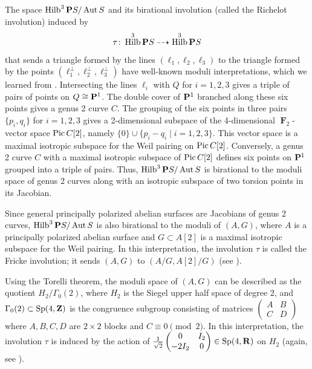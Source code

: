 \documentclass[11pt,reqno]{amsart}
\theoremstyle{plain}
\theoremstyle{definition}
\theoremstyle{remark}
\numberwithin{equation}{section}
\DeclareMathOperator{\Hilb}{Hilb}
\DeclareMathOperator{\F}{\mathbf F}
\numberwithin{equation}{section}
\begin{document}
\begin{remark}\label{rem:richelot}
  The space $\Hilb^3 \P S / \Aut S$ and its birational involution (called the Richelot involution) induced by
  \begin{equation}\label{eqn:richelot}
    \tau \from \Hilb^3 \P S \dashrightarrow \Hilb^3 \P S
  \end{equation}
  that sends a triangle formed by the lines $(\ell_1, \ell_2, \ell_3)$ to the triangle formed by the points $(\ell_1^\perp, \ell_2^\perp, \ell_3^\perp)$ have well-known moduli interpretations, which we learned from \cite[Example~4.2]{dol.how:15}.
  Intersecting the lines $\ell_i$ with $Q$ for $i = 1, 2, 3$ gives a triple of pairs of points on $Q \cong \P^1$.
  The double cover of $\P^1$ branched along these six points gives a genus 2 curve $C$.
  The grouping of the six points in three pairs $\{p_i, q_i\}$ for $i = 1, 2, 3$ gives a 2-dimensional subspace of the 4-dimensional $\F_2$-vector space $\Pic C [2]$, namely $\{0\} \cup \{p_i - q_i \mid i = 1,2,3\}$.
  This vector space is a maximal isotropic subspace for the Weil pairing on $\Pic C[2]$.
  Conversely, a genus 2 curve $C$ with a maximal isotropic subspace of $\Pic C[2]$ defines six points on $\P^1$ grouped into a triple of pairs.
  Thus, $\Hilb^3 \P S / \Aut S$ is birational to the moduli space of genus 2 curves along with an isotropic subspace of two torsion points in its Jacobian.

  Since general principally polarized abelian surfaces are Jacobians of genus 2 curves, $\Hilb^3 \P S / \Aut S$ is also birational to the moduli of $(A, G)$, where $A$ is a principally polarized abelian surface and $G \subset A[2]$ is a maximal isotropic subspace for the Weil pairing.
  In this interpretation, the involution $\tau$ is called the Fricke involution; it sends $(A, G)$ to $(A/G, A[2]/G)$ (see \cite[Page~2]{muk:12}).

  Using the Torelli theorem, the moduli space of $(A, G)$ can be described as the quotient $H_2/\Gamma_0(2)$, where $H_2$ is the Siegel upper half space of degree 2, and $\Gamma_0(2) \subset \operatorname{Sp}(4, \Z)$ is the congruence subgroup consisting of matrices $\begin{pmatrix} A & B \\ C & D \end{pmatrix}$ where $A, B, C, D$ are $2 \times 2$ blocks and $C \equiv 0 \pmod 2$.
  In this interpretation, the involution $\tau$ is induced by the action of $\frac{1}{\sqrt 2} \begin{pmatrix} 0 & I_2 \\ -2 I_2 & 0 \end{pmatrix} \in \operatorname{Sp}(4, \R)$ on $H_2$ (again, see \cite[Page~2]{muk:12}).


\end{remark}
\end{document}

